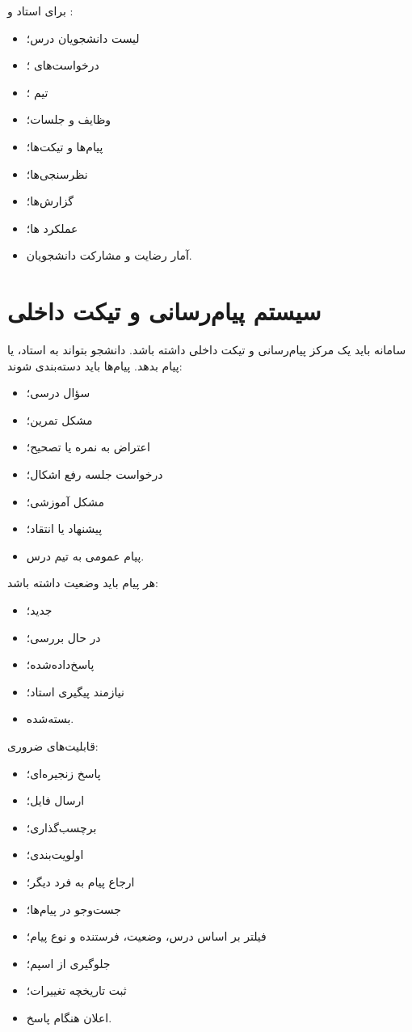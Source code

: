 \documentclass[12pt,a4paper]{article}
\begin{document}
برای استاد و :
\begin{itemize}
\item لیست دانشجویان درس؛
\item درخواست‌های ؛
\item تیم ؛
\item وظایف و جلسات؛
\item پیام‌ها و تیکت‌ها؛
\item نظرسنجی‌ها؛
\item گزارش‌ها؛
\item عملکرد ها؛
\item آمار رضایت و مشارکت دانشجویان.
\end{itemize}

\section{سیستم پیام‌رسانی و تیکت داخلی}
سامانه باید یک مرکز پیام‌رسانی و تیکت داخلی داشته باشد. دانشجو بتواند به استاد،  یا  پیام بدهد. پیام‌ها باید دسته‌بندی شوند:
\begin{itemize}
\item سؤال درسی؛
\item مشکل تمرین؛
\item اعتراض به نمره یا تصحیح؛
\item درخواست جلسه رفع اشکال؛
\item مشکل آموزشی؛
\item پیشنهاد یا انتقاد؛
\item پیام عمومی به تیم درس.
\end{itemize}

هر پیام باید وضعیت داشته باشد:
\begin{itemize}
\item جدید؛
\item در حال بررسی؛
\item پاسخ‌داده‌شده؛
\item نیازمند پیگیری استاد؛
\item بسته‌شده.
\end{itemize}

قابلیت‌های ضروری:
\begin{itemize}
\item پاسخ زنجیره‌ای؛
\item ارسال فایل؛
\item برچسب‌گذاری؛
\item اولویت‌بندی؛
\item ارجاع پیام به فرد دیگر؛
\item جست‌وجو در پیام‌ها؛
\item فیلتر بر اساس درس، وضعیت، فرستنده و نوع پیام؛
\item جلوگیری از اسپم؛
\item ثبت تاریخچه تغییرات؛
\item اعلان هنگام پاسخ.
\end{itemize}
\end{document}
